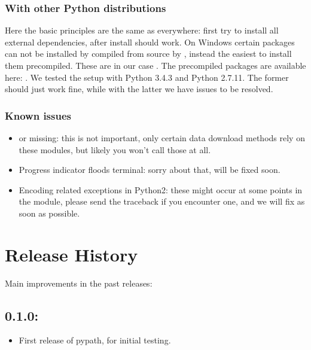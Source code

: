 \documentclass[letterpaper,10pt,english]{sphinxmanual}
\begin{document}
\subsection{With other Python distributions}
\label{\detokenize{index:with-other-python-distributions}}
Here the basic principles are the same as everywhere: first try to install all
external dependencies, after  install should work. On Windows certain
packages can not be installed by compiled from source by , instead the
easiest to install them precompiled. These are in our case . The
precompiled packages are available here:
. We tested the setup with Python
3.4.3 and Python 2.7.11. The former should just work fine, while with the
latter we have issues to be resolved.


\subsection{Known issues}
\label{\detokenize{index:known-issues}}\begin{itemize}
\item {} 
 \textendash{} or  missing: this is not
important, only certain data download methods rely on these modules, but
likely you won’t call those at all.

\item {} 
Progress indicator floods terminal: sorry about that, will be fixed soon.

\item {} 
Encoding related exceptions in Python2: these might occur at some points in
the module, please send the traceback if you encounter one, and we will fix
as soon as possible.

\end{itemize}



\chapter{Release History}
\label{\detokenize{index:release-history}}
Main improvements in the past releases:


\section{0.1.0:}
\label{\detokenize{index:id1}}\begin{itemize}
\item {} 
First release of pypath, for initial testing.

\end{itemize}
\end{document}
